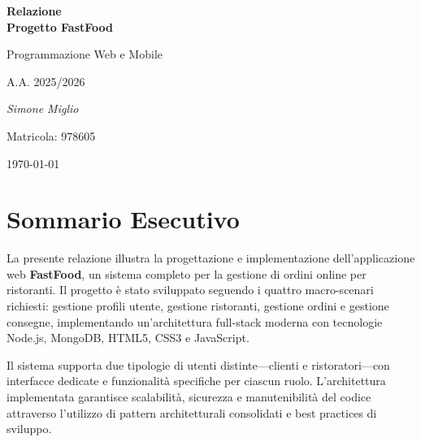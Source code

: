 \documentclass[12pt,a4paper]{article}
\begin{document}
\begin{titlepage}
    \centering
    \vspace*{2cm}
    
    {\huge\bfseries Relazione\\Progetto FastFood\par}
    \vspace{1cm}
    {\Large Programmazione Web e Mobile\par}
    \vspace{0.5cm}
    {\large A.A. 2025/2026\par}
    \vspace{2cm}
    
    \vspace{2cm}
    
    {\Large\itshape Simone Miglio\par}
    \vspace{0.5cm}
    {\large Matricola: 978605\par}
    
    \vfill
    
    {\large \today\par}
\end{titlepage}

\tableofcontents
\newpage

\section*{Sommario Esecutivo}

La presente relazione illustra la progettazione e implementazione dell'applicazione web \textbf{FastFood}, un sistema completo per la gestione di ordini online per ristoranti. Il progetto è stato sviluppato seguendo i quattro macro-scenari richiesti: gestione profili utente, gestione ristoranti, gestione ordini e gestione consegne, implementando un'architettura full-stack moderna con tecnologie Node.js, MongoDB, HTML5, CSS3 e JavaScript.

Il sistema supporta due tipologie di utenti distinte---clienti e ristoratori---con interfacce dedicate e funzionalità specifiche per ciascun ruolo. L'architettura implementata garantisce scalabilità, sicurezza e manutenibilità del codice attraverso l'utilizzo di pattern architetturali consolidati e best practices di sviluppo.
\end{document}
